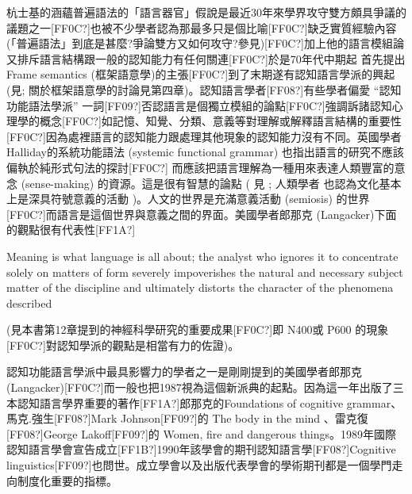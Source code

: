 杭士基的涵蘊普遍語法的「語言器官」假說是最近30年來學界攻守雙方頗具爭議的議題之一[FF0C?]也被不少學者認為那最多只是個比喻[FF0C?]缺乏實質經驗內容 (「普遍語法」到底是甚麼?爭論雙方又如何攻守?參見\citealt{EvansLevinson2009})[FF0C?]加上他的語言模組論又排斥語言結構跟一般的認知能力有任何關連[FF0C?]於是70年代中期起 \parencite{Fillmore1976} 首先提出 Frame semantics (框架語意學)的主張[FF0C?]到了末期遂有認知語言學派的興起 (見\citealt{Behme2014}; 關於框架語意學的討論見第四章)。認知語言學者[FF08?]有些學者偏愛 “認知功能語法學派” 一詞[FF09?]否認語言是個獨立模組的論點[FF0C?]強調訴諸認知心理學的概念[FF0C?]如記憶、知覺、分類、意義等對理解或解釋語言結構的重要性[FF0C?]因為處裡語言的認知能力跟處理其他現象的認知能力沒有不同。英國學者 Halliday的系統功能語法 (systemic functional grammar) 也指出語言的研究不應該偏執於純形式句法的探討[FF0C?] 而應該把語言理解為一種用來表達人類豐富的意念 (sense-making) 的資源。這是很有智慧的論點 ( 見 \citealt{HallidayMatthiessen2004}; 人類學者 \parencite{Geertz1983} 也認為文化基本上是深具符號意義的活動 )。人文的世界是充滿意義活動 (semiosis) 的世界 [FF0C?]而語言是這個世界與意義之間的界面。美國學者郎那克 (Langacker)下面的觀點很有代表性[FF1A?]

Meaning is what language is all about; the analyst who ignores it to concentrate solely on matters of form severely impoverishes the natural and necessary subject matter of the discipline and ultimately distorts the character of the phenomena described \citep[12]{Langacker1987}

(見本書第12章提到的神經科學研究的重要成果[FF0C?]即 N400或 P600 的現象[FF0C?]對認知學派的觀點是相當有力的佐證)。

認知功能語言學派中最具影響力的學者之一是剛剛提到的美國學者郎那克   (Langacker)[FF0C?]而一般也把1987視為這個新派典的起點。因為這一年出版了三本認知語言學界重要的著作[FF1A?]郎那克的Foundations of cognitive grammar、馬克.強生[FF08?]Mark Johnson[FF09?]的 The body in the mind 、雷克復[FF08?]George Lakoff[FF09?]的 Women, fire and dangerous things。1989年國際認知語言學會宣告成立[FF1B?]1990年該學會的期刊認知語言學[FF08?]Cognitive linguistics[FF09?]也問世。成立學會以及出版代表學會的學術期刊都是一個學門走向制度化重要的指標。


